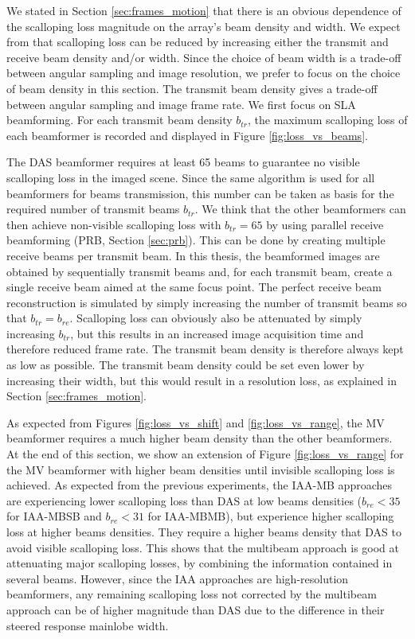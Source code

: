 We stated in Section \ref{sec:frames_motion} that there is an obvious dependence of the scalloping loss magnitude on the array's beam density and width.
We expect from \cite{Asen_shift_invariance} that scalloping loss can be reduced by increasing either the transmit and receive beam density and/or width.
Since the choice of beam width is a trade-off between angular sampling and image resolution, we prefer to focus on the choice of beam density in this section.
The transmit beam density gives a trade-off between angular sampling and image frame rate. We first focus on SLA beamforming.
For each transmit beam density $b_{tr}$, the maximum scalloping loss of each beamformer is recorded and displayed in Figure \ref{fig:loss_vs_beams}.

The DAS beamformer requires at least 65 beams to guarantee no visible scalloping loss in the imaged scene. Since the same algorithm is used for all beamformers for beams transmission, this number can be taken as basis for the required number of transmit beams $b_{tr}$. We think that the other beamformers can then achieve non-visible scalloping loss with $b_{tr} = 65$ by using parallel receive beamforming (PRB, Section \ref{sec:prb}). This can be done by creating multiple receive beams per transmit beam.
In this thesis, the beamformed images are obtained by sequentially transmit beams and, for each transmit beam, create a single receive beam aimed at the same focus point.
The perfect receive beam reconstruction is simulated by simply increasing the number of transmit beams so that $b_{tr} = b_{re}$.
Scalloping loss can obviously also be attenuated by simply increasing $b_{tr}$, but this results in an increased image acquisition time and therefore reduced frame rate. The transmit beam density is therefore always kept as low as possible.
The transmit beam density could be set even lower by increasing their width, but this would result in a resolution loss, as explained in Section \ref{sec:frames_motion}. 

As expected from Figures \ref{fig:loss_vs_shift} and \ref{fig:loss_vs_range}, the MV beamformer requires a much higher beam density than the other beamformers.
At the end of this section, we show an extension of Figure \ref{fig:loss_vs_range} for the MV beamformer with higher beam densities until invisible scalloping loss is achieved.
As expected from the previous experiments, the IAA-MB approaches are experiencing lower scalloping loss than DAS at low beams densities ($b_{re} < 35$ for IAA-MBSB and $b_{re} < 31$ for IAA-MBMB), but experience higher scalloping loss at higher beams densities. They require a higher beams density that DAS to avoid visible scalloping loss. This shows that the multibeam approach is good at attenuating major scalloping losses, by combining the information contained in several beams. However, since the IAA approaches are high-resolution beamformers, any remaining scalloping loss not corrected by the multibeam approach can be of higher magnitude than DAS due to the difference in their steered response mainlobe width.

